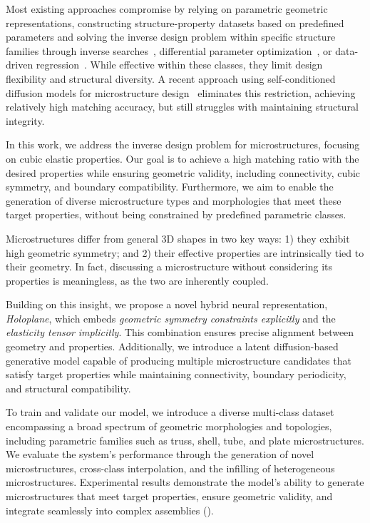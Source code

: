 Most existing approaches compromise by relying on parametric geometric representations, constructing structure-property datasets based on predefined parameters and solving the inverse design problem within specific structure families through inverse searches~\cite{schumacher2015Microstructures, panetta2015Elastic}, differential parameter optimization~\cite{tozoni2020Lowparametric}, or data-driven regression~\cite{bastek2022Inverting, wang2022IHGAN, Zheng2023}. While effective within these classes, they limit design flexibility and structural diversity. A recent approach using self-conditioned diffusion models for microstructure design~\cite{Yang2024} eliminates this restriction, achieving relatively high matching accuracy, but still struggles with maintaining structural integrity.
 

In this work, we address the inverse design problem for microstructures, focusing on cubic elastic properties. Our goal is to achieve a high matching ratio with the desired properties while ensuring geometric validity, including connectivity, cubic symmetry, and boundary compatibility. Furthermore, we aim to enable the generation of diverse microstructure types and morphologies that meet these target properties, without being constrained by predefined parametric classes.

Microstructures differ from general 3D shapes in two key ways: 1) they exhibit high geometric symmetry; and 2) their effective properties are intrinsically tied to their geometry. In fact, discussing a microstructure without considering its properties is meaningless, as the two are inherently coupled.

Building on this insight, we propose a novel hybrid neural representation, \emph{Holoplane}, which embeds \emph{geometric symmetry constraints explicitly} and the \emph{elasticity tensor implicitly}. This combination ensures precise alignment between geometry and properties.
Additionally, we introduce a latent diffusion-based generative model capable of producing multiple microstructure candidates that satisfy target properties while maintaining connectivity, boundary periodicity, and structural compatibility.


To train and validate our model, we introduce a diverse multi-class dataset encompassing a broad spectrum of geometric morphologies and topologies, including parametric families such as truss, shell, tube, and plate microstructures. We evaluate the system’s performance through the generation of novel microstructures, cross-class interpolation, and the infilling of heterogeneous microstructures. Experimental results demonstrate the model’s ability to generate microstructures that meet target properties, ensure geometric validity, and integrate seamlessly into complex assemblies ().


